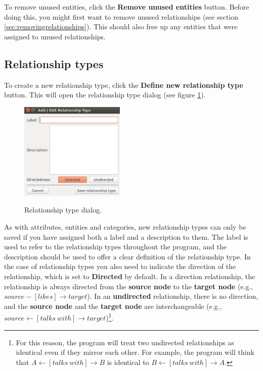 \documentclass{memoir}
\begin{document}
To remove unused entities, click the \textbf{Remove unused entities} button. Before doing this, you might first want to remove unused relationships (see section \ref{sec:removingrelationships}). This should also free up any entities that were assigned to unused relationships.

\subsection{Relationship types}
\label{sec:relationshiptypes}

To create a new relationship type, click the \textbf{Define new relationship type} button. This will open the relationship type dialog (see figure \ref{fig:relationshiptypedialog}). 

\begin{figure}[h!]
  \centering
  \caption{Relationship type dialog.}
  \includegraphics[width=50mm]{Screenshot_17.pdf}
  \label{fig:relationshiptypedialog}
\end{figure}

As with attributes, entities and categories, new relationship types can only be saved if you have assigned both a label and a description to them. The label is used to refer to the relationship types throughout the program, and the description should be used to offer a clear definition of the relationship type. In the case of relationship types you also need to indicate the direction of the relationship, which is set to \textbf{Directed} by default. In a direction relationship, the relationship is always directed from the \textbf{source node} to the \textbf{target node} (e.g., \(source-[likes]\rightarrow target\)). In an \textbf{undirected} relationship, there is no direction, and the \textbf{source node} and the \textbf{target node} are interchangeable (e.g., \(source\leftarrow [talks\ with]\rightarrow target\))\footnote{For this reason, the program will treat two undirected relationships as identical even if they mirror each other. For example, the program will think that \(A\leftarrow [talks\ with]\rightarrow B\) is identical to \(B\leftarrow [talks\ with]\rightarrow A\).}. 
\end{document}
